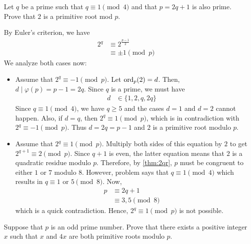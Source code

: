 \begin{problem}
	Let $q$ be a prime such that $q\equiv 1\pmod 4$ and that $p=2q+1$ is also prime. Prove that $2$ is a primitive root mod $p$.
\end{problem}

\begin{solution}
	By Euler's criterion, we have
		\begin{align*}
			2^q
				& \equiv 2^{\frac{p-1}{2}}\\
				& \equiv \pm 1 \pmod{p}
		\end{align*}
 We analyze both cases now:
		\begin{itemize}
			\item Assume that $2^q \equiv -1 \pmod p$. Let $\operatorname{ord}_p(2)=d$. Then, $d\mid \varphi(p)=p-1=2q$. Since $q$ is a prime, we must have
				\begin{align*}
					d
						& \in \{1,2,q,2q\}
				\end{align*}
			Since $q \equiv 1 \pmod 4$, we have $q \geq 5$ and the cases $d=1$ and $d=2$ cannot happen. Also, if $d=q$, then $2^q \equiv 1 \pmod p$, which is in contradiction with $2^q \equiv -1 \pmod p$. Thus $d=2q=p-1$ and $2$ is a primitive root modulo $p$.
			\item Assume that $2^q \equiv 1 \pmod{p}$. Multiply both sides of this equation by $2$ to get $2^{q+1} \equiv 2 \pmod p$. Since $q+1$ is even, the latter equation means that $2$ is a quadratic residue modulo $p$. Therefore, by \autoref{thm:2qr}, $p$ must be congruent to either $1$ or $7$ modulo $8$. However, problem says that $q \equiv 1 \pmod 4$ which results in $q \equiv 1$ or $5 \pmod 8$. Now,
				\begin{align*}
					p
						& \equiv 2q +1\\
						& \equiv 3,5 \pmod 8
				\end{align*}
			which is a quick contradiction. Hence, $2^q \equiv 1 \pmod{p}$ is not possible.
		\end{itemize}
\end{solution}

\begin{problem}
	Suppose that $p$ is an odd prime number. Prove that there exists a positive integer $x$ such that $x$ and $4x$ are both primitive roots modulo $p$.
\end{problem}

